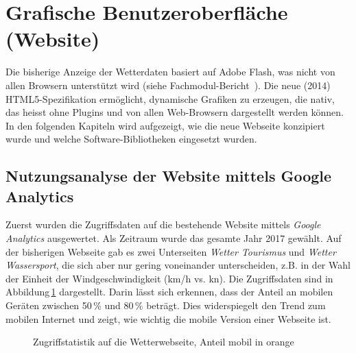 \section{Grafische Benutzeroberfläche (Website)}
Die bisherige Anzeige der Wetterdaten basiert auf Adobe Flash, was nicht von allen Browsern unterstützt wird (siehe Fachmodul-Bericht~\cite{BilWie2018MUIu}). Die neue (2014) HTML5-Spezifikation ermöglicht, dynamische Grafiken zu erzeugen, die nativ, das heisst ohne Plugins und von allen Web-Browsern dargestellt werden können. In den folgenden Kapiteln wird aufgezeigt, wie die neue Webseite konzipiert wurde und welche Software-Bibliotheken eingesetzt wurden.


\subsection{Nutzungsanalyse der Website mittels Google Analytics}
\label{subsec:googleAnalytics}
Zuerst wurden die Zugriffsdaten auf die bestehende Website mittels \emph{Google Analytics} ausgewertet. Als Zeitraum wurde das gesamte Jahr 2017 gewählt. Auf der bisherigen Webseite gab es zwei Unterseiten \emph{Wetter Tourismus} und \emph{Wetter Wassersport}, die sich aber nur gering voneinander unterscheiden, z.B. in der Wahl der Einheit der Windgeschwindigkeit (km/h vs. kn). Die Zugriffsdaten sind in Abbildung\,\ref{img:google_mobile} dargestellt. Darin lässt sich erkennen, dass der Anteil an mobilen Geräten zwischen 50\,\% und 80\,\% beträgt. Dies widerspiegelt den Trend zum mobilen Internet und zeigt, wie wichtig die mobile Version einer Webseite ist.

\begin{figure}[htb!]
	\centering
	\caption{Zugriffstatistik auf die Wetterwebseite, Anteil mobil in orange}
	\label{img:google_mobile}
\end{figure}


